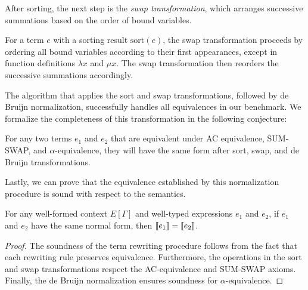 \documentclass[runningheads]{llncs}
\begin{document}
After sorting, the next step is the \textit{swap transformation}, which arranges successive summations based on the order of bound variables.
\begin{definition}
For a term \( e \) with a sorting result \( \textrm{sort}(e) \), the swap transformation proceeds by ordering all bound variables according to their first appearances, except in function definitions \( \lambda x \) and \( \mu x \). The swap transformation then reorders the successive summations accordingly.
\end{definition}

The algorithm that applies the sort and swap transformations, followed by de Bruijn normalization, successfully handles all equivalences in our benchmark. We formalize the completeness of this transformation in the following conjecture:

\begin{conjecture}
    For any two terms \( e_1 \) and \( e_2 \) that are equivalent under AC equivalence, SUM-SWAP, and \( \alpha \)-equivalence, they will have the same form after sort, swap, and de Bruijn transformations.
\end{conjecture}







Lastly, we can prove that the equivalence established by this normalization procedure is sound with respect to the semantics.

\begin{theorem}[Soundness]
    For any well-formed context \( E[\Gamma] \) and well-typed expressions \( e_1 \) and \( e_2 \), if  $e_1$ and $e_2$ have the same normal form, then \( {\llbracket e_1 \rrbracket} = {\llbracket e_2 \rrbracket} \).
\end{theorem}

\begin{proof}
    The soundness of the term rewriting procedure follows from the fact that each rewriting rule preserves equivalence. Furthermore, the operations in the sort and swap transformations respect the AC-equivalence and SUM-SWAP axioms. Finally, the de Bruijn normalization ensures soundness for \( \alpha \)-equivalence.
\end{proof}
\end{document}
